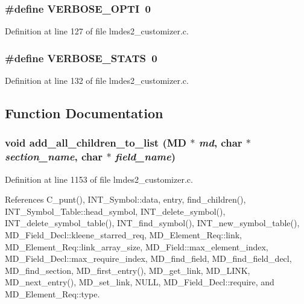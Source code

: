 \subsubsection{\setlength{\rightskip}{0pt plus 5cm}\#define VERBOSE\_\-OPTI~0}\label{lmdes2__customizer_8c_c6d967d290f940fb8143bf141f311a2a}




Definition at line 127 of file lmdes2\_\-customizer.c.
\subsubsection{\setlength{\rightskip}{0pt plus 5cm}\#define VERBOSE\_\-STATS~0}\label{lmdes2__customizer_8c_a0fa4d0652fbff641ed614b478884266}




Definition at line 132 of file lmdes2\_\-customizer.c.

\subsection{Function Documentation}
\subsubsection{\setlength{\rightskip}{0pt plus 5cm}void add\_\-all\_\-children\_\-to\_\-list (\bf{MD} $\ast$ {\em md}, char $\ast$ {\em section\_\-name}, char $\ast$ {\em field\_\-name})}\label{lmdes2__customizer_8c_63b739f1e28f24f379411fb7743e6b44}




Definition at line 1153 of file lmdes2\_\-customizer.c.

References C\_\-punt(), INT\_\-Symbol::data, entry, find\_\-children(), INT\_\-Symbol\_\-Table::head\_\-symbol, INT\_\-delete\_\-symbol(), INT\_\-delete\_\-symbol\_\-table(), INT\_\-find\_\-symbol(), INT\_\-new\_\-symbol\_\-table(), MD\_\-Field\_\-Decl::kleene\_\-starred\_\-req, MD\_\-Element\_\-Req::link, MD\_\-Element\_\-Req::link\_\-array\_\-size, MD\_\-Field::max\_\-element\_\-index, MD\_\-Field\_\-Decl::max\_\-require\_\-index, MD\_\-find\_\-field, MD\_\-find\_\-field\_\-decl, MD\_\-find\_\-section, MD\_\-first\_\-entry(), MD\_\-get\_\-link, MD\_\-LINK, MD\_\-next\_\-entry(), MD\_\-set\_\-link, NULL, MD\_\-Field\_\-Decl::require, and MD\_\-Element\_\-Req::type.

